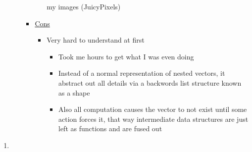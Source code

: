 \documentclass{article}
\begin{document}
\begin{itemize}
\begin{enumerate}
\begin{itemize}
\begin{itemize}
my images (JuicyPixels)
\end{itemize}
\item \uline{Cons}
\begin{itemize}
\item Very hard to understand at first
\begin{itemize}
\item Took me hours to get what I was even doing
\item Instead of a normal representation of nested vectors, it
abstract out all details via a backwords list structure
known as a shape
\item Also all computation causes the vector to not exist until
some action forces it, that way intermediate data
structures are just left as functions and are fused out
\end{itemize}
\end{itemize}
\end{itemize}
\end{enumerate}
\end{itemize}
\begin{enumerate}
\item 
\label{sec-2-1}
\end{enumerate}
\end{document}
